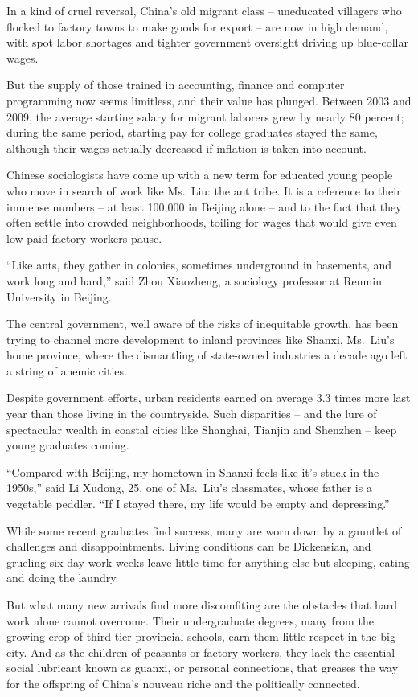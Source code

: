 ﻿\documentclass[12pt]{article}
\begin{document}
In a kind of cruel reversal, China's old migrant class -- uneducated villagers who flocked to
factory towns to make goods for export -- are now in high demand, with spot labor shortages and
tighter government oversight driving up blue-collar wages.

But the supply of those trained in accounting, finance and computer programming now seems limitless,
and their value has plunged. Between 2003 and 2009, the average starting salary for migrant laborers
grew by nearly 80 percent; during the same period, starting pay for college graduates stayed the
same, although their wages actually decreased if inflation is taken into account.

Chinese sociologists have come up with a new term for educated young people who move in search of
work like Ms.~Liu: the ant tribe. It is a reference to their immense numbers -- at least 100,000 in
Beijing alone -- and to the fact that they often settle into crowded neighborhoods, toiling for
wages that would give even low-paid factory workers pause.

``Like ants, they gather in colonies, sometimes underground in basements, and work long and hard,''
said Zhou Xiaozheng, a sociology professor at Renmin University in Beijing.

The central government, well aware of the risks of inequitable growth, has been trying to channel
more development to inland provinces like Shanxi, Ms.~Liu's home province, where the dismantling of
state-owned industries a decade ago left a string of anemic cities.

Despite government efforts, urban residents earned on average 3.3 times more last year than those
living in the countryside. Such disparities -- and the lure of spectacular wealth in coastal cities
like Shanghai, Tianjin and Shenzhen -- keep young graduates coming.

``Compared with Beijing, my hometown in Shanxi feels like it's stuck in the 1950s,'' said Li Xudong,
25, one of Ms.~Liu's classmates, whose father is a vegetable peddler. ``If I stayed there, my life
would be empty and depressing.''

While some recent graduates find success, many are worn down by a gauntlet of challenges and
disappointments. Living conditions can be Dickensian, and grueling six-day work weeks leave little
time for anything else but sleeping, eating and doing the laundry.

But what many new arrivals find more discomfiting are the obstacles that hard work alone cannot
overcome. Their undergraduate degrees, many from the growing crop of third-tier provincial schools,
earn them little respect in the big city. And as the children of peasants or factory workers, they
lack the essential social lubricant known as guanxi, or personal connections, that greases the way
for the offspring of China's nouveau riche and the politically connected.
\end{document}
